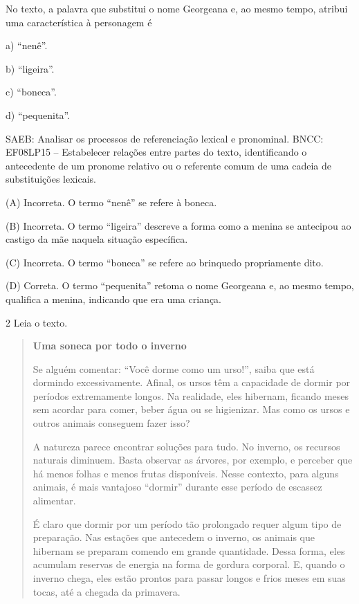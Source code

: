 
No texto, a palavra que substitui o nome Georgeana e, ao mesmo tempo,
atribui uma característica à personagem é

a) ``nenê''.

b) ``ligeira''.

c) ``boneca''.

d) ``pequenita''.

SAEB: Analisar os processos de referenciação lexical e pronominal. BNCC:
EF08LP15 -- Estabelecer relações entre partes do texto, identificando o
antecedente de um pronome relativo ou o referente comum de uma cadeia de
substituições lexicais.

(A) Incorreta. O termo ``nenê'' se refere à boneca.

(B) Incorreta. O termo ``ligeira'' descreve a forma como a menina se
antecipou ao castigo da mãe naquela situação específica.

(C) Incorreta. O termo ``boneca'' se refere ao brinquedo propriamente
dito.

(D) Correta. O termo ``pequenita'' retoma o nome Georgeana e, ao mesmo
tempo, qualifica a menina, indicando que era uma criança.

\num{2} Leia o texto.

\begin{quote}
\textbf{Uma soneca por todo o inverno}

Se alguém comentar: ``Você dorme como um urso!'', saiba que está
dormindo excessivamente. Afinal, os ursos têm a capacidade de dormir por
períodos extremamente longos. Na realidade, eles hibernam, ficando meses
sem acordar para comer, beber água ou se higienizar. Mas como os ursos e
outros animais conseguem fazer isso?

A natureza parece encontrar soluções para tudo. No inverno, os recursos
naturais diminuem. Basta observar as árvores, por exemplo, e perceber
que há menos folhas e menos frutas disponíveis. Nesse contexto, para
alguns animais, é mais vantajoso ``dormir'' durante esse período de
escassez alimentar.

É claro que dormir por um período tão prolongado requer algum tipo de
preparação. Nas estações que antecedem o inverno, os animais que
hibernam se preparam comendo em grande quantidade. Dessa forma, eles
acumulam reservas de energia na forma de gordura corporal. E, quando o
inverno chega, eles estão prontos para passar longos e frios meses em
suas tocas, até a chegada da primavera.
\end{quote}

